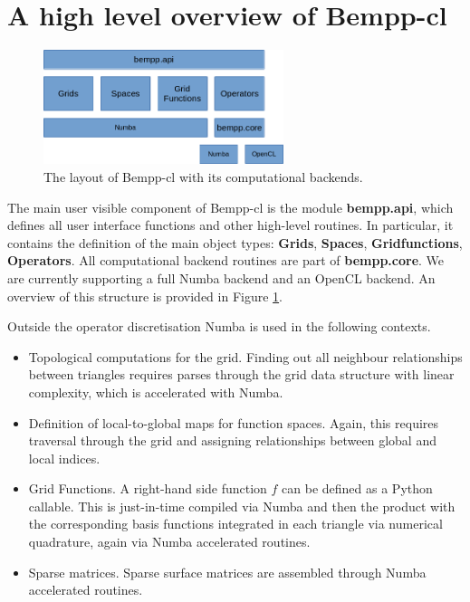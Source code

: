 \section{A high level overview of Bempp-cl}

\begin{figure}
	\center
	\includegraphics[width=7cm]{img/bempp_overview}
	\caption{The layout of Bempp-cl with its computational backends.}
	\label{fig:overview}
\end{figure}

The main user visible component of Bempp-cl is the module \textbf{bempp.api}, which defines all user interface functions and other high-level routines. In particular, it contains the definition of the main object types: \textbf{Grids}, \textbf{Spaces}, \textbf{Gridfunctions}, \textbf{Operators}. All computational backend routines are part of \textbf{bempp.core}. We are currently supporting a full Numba backend and an OpenCL backend. An overview of this structure is provided in Figure \ref{fig:overview}.

Outside the operator discretisation Numba is used in the following contexts.
\begin{itemize}
	\item Topological computations for the grid. Finding out all neighbour relationships between triangles requires parses through the grid data structure with linear complexity, which is accelerated with Numba.
	\item Definition of local-to-global maps for function spaces. Again, this requires traversal through the grid and assigning relationships between global and local indices.
	\item Grid Functions. A right-hand side function $f$ can be defined as a Python callable. This is just-in-time compiled via Numba and then the product with the corresponding basis functions integrated in each triangle via numerical quadrature, again via Numba accelerated routines.
	\item Sparse matrices. Sparse surface matrices are assembled through Numba accelerated routines.
\end{itemize}

